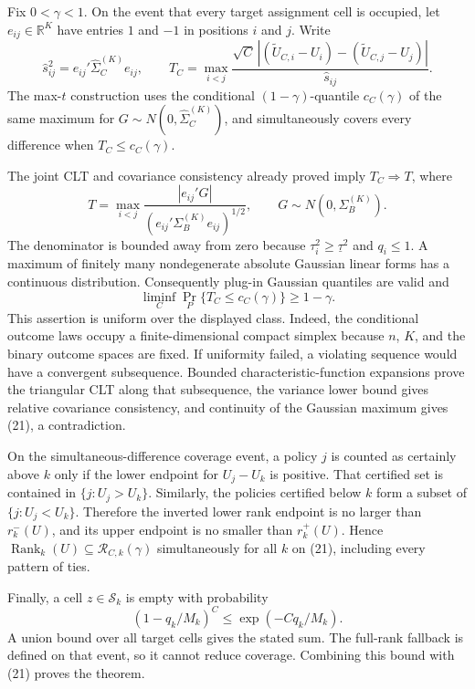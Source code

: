 Fix \(0<\gamma<1\).  On the event that every target assignment cell is occupied, let \(e_{ij}\in\mathbb R^K\) have entries \(1\) and \(-1\) in positions \(i\) and \(j\).  Write
\[
 \widehat s_{ij}^2=e_{ij}'\widehat\Sigma_C^{(K)}e_{ij},
 \qquad
 T_C=\max_{i<j}\frac{\sqrt C\,| (\widetilde U_{C,i}-U_i)-(\widetilde U_{C,j}-U_j)|}{\widehat s_{ij}}.
\]
The max-\(t\) construction uses the conditional \((1-\gamma)\)-quantile \(c_C(\gamma)\) of the same maximum for \(G\sim N(0,\widehat\Sigma_C^{(K)})\), and simultaneously covers every difference when \(T_C\leq c_C(\gamma)\).

The joint CLT and covariance consistency already proved imply \(T_C\Rightarrow T\), where
\[
 T=\max_{i<j}\frac{|e_{ij}'G|}{(e_{ij}'\Sigma_B^{(K)}e_{ij})^{1/2}},
 \qquad G\sim N(0,\Sigma_B^{(K)}).
\]
The denominator is bounded away from zero because \(\tau_i^2\geq\underline\tau^2\) and \(q_i\leq1\).  A maximum of finitely many nondegenerate absolute Gaussian linear forms has a continuous distribution.  Consequently plug-in Gaussian quantiles are valid and
\[
 \liminf_C\Pr_P\{T_C\leq c_C(\gamma)\}\geq1-\gamma. \tag{21}
\]
This assertion is uniform over the displayed class.  Indeed, the conditional outcome laws occupy a finite-dimensional compact simplex because \(n\), \(K\), and the binary outcome spaces are fixed.  If uniformity failed, a violating sequence would have a convergent subsequence.  Bounded characteristic-function expansions prove the triangular CLT along that subsequence, the variance lower bound gives relative covariance consistency, and continuity of the Gaussian maximum gives (21), a contradiction.

On the simultaneous-difference coverage event, a policy \(j\) is counted as certainly above \(k\) only if the lower endpoint for \(U_j-U_k\) is positive.  That certified set is contained in \(\{j:U_j>U_k\}\).  Similarly, the policies certified below \(k\) form a subset of \(\{j:U_j<U_k\}\).  Therefore the inverted lower rank endpoint is no larger than \(r_k^-(U)\), and its upper endpoint is no smaller than \(r_k^+(U)\).  Hence \(\operatorname{Rank}_k(U)\subseteq\mathcal R_{C,k}(\gamma)\) simultaneously for all \(k\) on (21), including every pattern of ties.

Finally, a cell \(z\in\mathcal S_k\) is empty with probability
\[
 (1-q_k/M_k)^C\leq\exp(-Cq_k/M_k).
\]
A union bound over all target cells gives the stated sum.  The full-rank fallback is defined on that event, so it cannot reduce coverage.  Combining this bound with (21) proves the theorem.